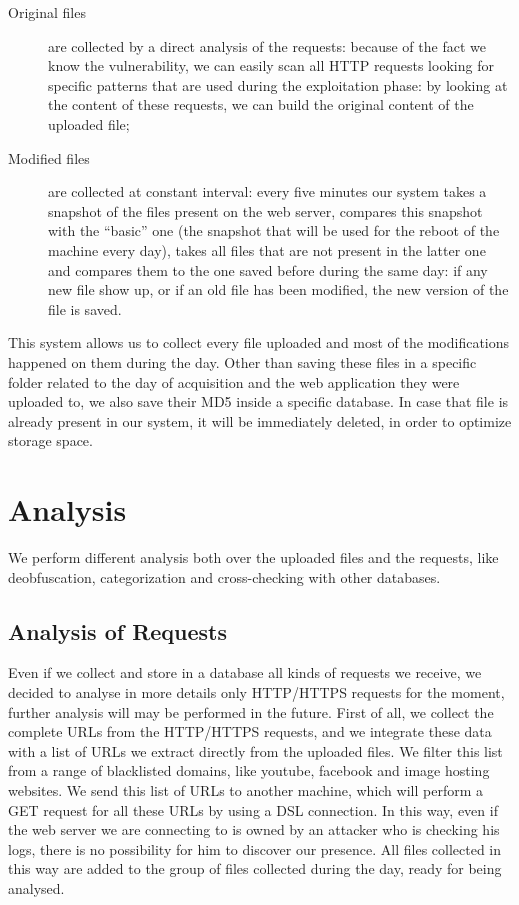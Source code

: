 \begin{description}
\item[Original files] are collected by a direct analysis of the requests: because of the fact we know the vulnerability, we can easily scan all HTTP requests looking for specific patterns that are used during the exploitation phase: by looking at the content of these requests, we can build the original content of the uploaded file;
\item[Modified files] are collected at constant interval: every five minutes our system takes a snapshot of the files present on the web server, compares this snapshot with the ``basic'' one (the snapshot that will be used for the reboot of the machine every day), takes all files that are not present in the latter one and compares them to the one saved before during the same day: if any new file show up, or if an old file has been modified, the new version of the file is saved.
\end{description}

This system allows us to collect every file uploaded and most of the modifications happened on them during the day.
Other than saving these files in a specific folder related to the day of acquisition and the web application they were uploaded to, we also save their MD5 inside a specific database. In case that file is already present in our system, it will be immediately deleted, in order to optimize storage space.

\section{Analysis}

We perform different analysis both over the uploaded files and the requests, like deobfuscation, categorization and cross-checking with other databases.

\subsection{Analysis of Requests}
\label{sec:SectionReqAnalysis}
Even if we collect and store in a database all kinds of requests we receive, we decided to analyse in more details only HTTP/HTTPS requests for the moment, further analysis will may be performed in the future.
First of all, we collect the complete URLs from the HTTP/HTTPS requests, and we integrate these data with a list of URLs we extract directly from the uploaded files. We filter this list from a range of blacklisted domains, like youtube, facebook and image hosting websites. We send this list of URLs to another machine, which will perform a GET request for all these URLs by using a DSL connection. In this way, even if the web server we are connecting to is owned by an attacker who is checking his logs, there is no possibility for him to discover our presence. All files collected in this way are added to the group of files collected during the day, ready for being analysed.

